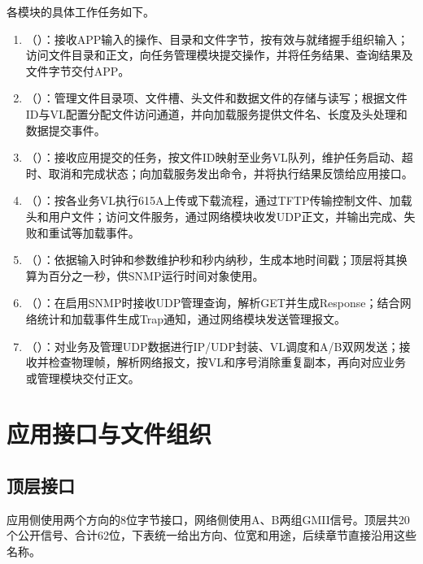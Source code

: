 各模块的具体工作任务如下。
\begin{enumerate}
\item {}（）：接收APP输入的操作、目录和文件字节，按有效与就绪握手组织输入；访问文件目录和正文，向任务管理模块提交操作，并将任务结果、查询结果及文件字节交付APP。
\item {}（）：管理文件目录项、文件槽、头文件和数据文件的存储与读写；根据文件ID与VL配置分配文件访问通道，并向加载服务提供文件名、长度及头处理和数据提交事件。
\item {}（）：接收应用提交的任务，按文件ID映射至业务VL队列，维护任务启动、超时、取消和完成状态；向加载服务发出命令，并将执行结果反馈给应用接口。
\item {}（）：按各业务VL执行615A上传或下载流程，通过TFTP传输控制文件、加载头和用户文件；访问文件服务，通过网络模块收发UDP正文，并输出完成、失败和重试等加载事件。
\item {}（）：依据输入时钟和参数维护秒和秒内纳秒，生成本地时间戳；顶层将其换算为百分之一秒，供SNMP运行时间对象使用。
\item {}（）：在启用SNMP时接收UDP管理查询，解析GET并生成Response；结合网络统计和加载事件生成Trap通知，通过网络模块发送管理报文。
\item {}（）：对业务及管理UDP数据进行IP/UDP封装、VL调度和A/B双网发送；接收并检查物理帧，解析网络报文，按VL和序号消除重复副本，再向对应业务或管理模块交付正文。
\end{enumerate}

\section{应用接口与文件组织}
\subsection{顶层接口}
应用侧使用两个方向的8位字节接口，网络侧使用A、B两组GMII信号。顶层共20个公开信号、合计62位，下表统一给出方向、位宽和用途，后续章节直接沿用这些名称。

